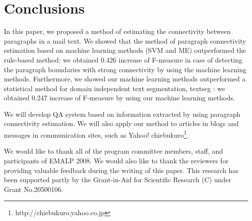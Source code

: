 \documentclass[english]{jnlp_1.4}
\begin{document}
\section{Conclusions}
\label{sec:Conclusions}

In this paper, 
we proposed a method of estimating the connectivity
between paragraphs in a mail text. 
We showed that 
the method of paragraph connectivity estimation 
based on machine learning methods (SVM and ME) 
outperformed the rule-based method: 
we obtained
0.426 increase of F-measure 
in case of detecting the paragraph boundaries with strong connectivity 
by using the machine learning methods.
Furthermore, 
we showed 
our machine learning methods outperformed 
a statistical method for domain independent text segmentation, 
textseg \cite{proc:utiyama2001}:
we obtained
0.247 increase of F-measure 
by using our machine learning methods.


We will develop QA system based on information extracted 
by using paragraph connectivity estimation. 
We will also apply our method to 
articles in blogs and 
messages in communication sites, 
such as Yahoo! chiebukuro\footnote[2]{http://chiebukuro.yahoo.co.jp}.




\acknowledgment
\label{sec:Acknowledgment}

We would like to thank 
all of the program committee members, staff, and participants of EMALP 2008.
We would also like to thank the reviewers for providing valuable feedback 
during the writing of this paper.
This research has been supported partly by the Grant-in-Aid for
Scientific Research (C) under Grant No.20500106.
\end{document}
